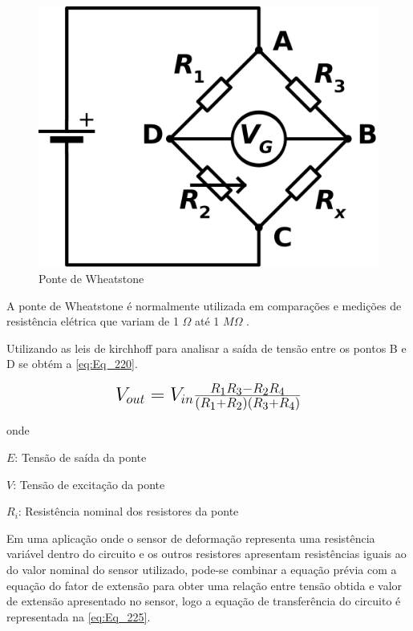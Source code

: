 \begin{figure}[htb]
	\caption{\label{fig:1090} Ponte de Wheatstone}
	\begin{center}
		\includegraphics[width=\textwidth]{pictures/1090.png}
	\end{center}
\end{figure}

A ponte de Wheatstone é normalmente utilizada em comparações e medições de resistência elétrica que variam de 1 $\Omega$ até 1 $M\Omega$ \autocite{Hollman2011}.

Utilizando as leis de kirchhoff para analisar a saída de tensão entre os pontos B e D se obtém a \autoref{eq:Eq_220}.

\begin{equation}\label{eq:Eq_220}%
\mbox{\fontsize{17.28}{21.6}\selectfont\( %
V_{out} = V_{in} \frac{R_1 R_3 - R_2 R_4}{(R_1 + R_2)(R_3 + R_4)}
\)} %
\end{equation}

onde

$E$: Tensão de saída da ponte

$V$: Tensão de excitação da ponte

$R_i$: Resistência nominal dos resistores da ponte

\hfill

Em uma aplicação onde o sensor de deformação representa uma resistência variável dentro do circuito e os outros resistores apresentam resistências
iguais ao do valor nominal do sensor utilizado, pode-se combinar a equação prévia com a equação do fator de extensão para obter uma relação entre tensão obtida
e valor de extensão apresentado no sensor, logo a equação de transferência do circuito é representada na \autoref{eq:Eq_225}.

